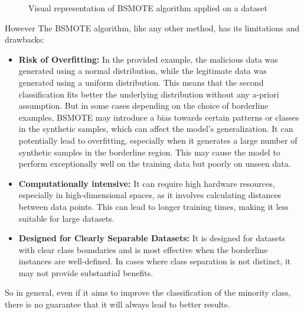\begin{figure}[H]
\begin{subfigure}{0.48\linewidth}
    \caption{}
    \label{fig:bordSMOTEApplied}
  \end{subfigure}
  \caption{Visual representation of BSMOTE algorithm applied on a dataset}
\end{figure}

However The BSMOTE algorithm, like any other method, has its limitations and drawbacks:
\begin{itemize}
  \item \textbf{Risk of Overfitting:} In the provided example, the malicious data was generated using a normal distribution, while the legitimate data was generated using a uniform distribution.
  This means that the second classification fits better the underlying distribution without any a-priori assumption.
  But in some cases depending on the choice of borderline examples, 
  BSMOTE may introduce a bias towards certain patterns or classes in the synthetic samples, which can affect the model's generalization.
  It can potentially lead to overfitting, especially when it generates a large number of synthetic samples in the borderline region. 
  This may cause the model to perform exceptionally well on the training data but poorly on unseen data.
  \item \textbf{Computationally intensive:} It can require high hardware resources, especially in high-dimensional spaces, as it involves calculating distances between data points. 
  This can lead to longer training times, making it less suitable for large datasets.
  \item \textbf{Designed for Clearly Separable Datasets:} It is designed for datasets with clear class boundaries and is most effective when the borderline instances are well-defined. 
  In cases where class separation is not distinct, it may not provide substantial benefits.
\end{itemize}
So in general, even if it aims to improve the classification of the minority class, there is no guarantee that it will always lead to better results.

